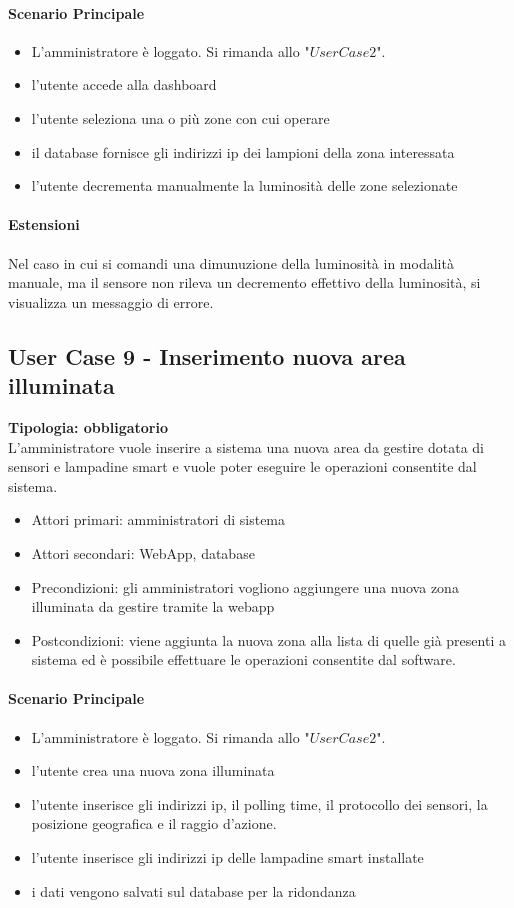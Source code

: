 \documentclass[12pt]{article}
\begin{document}
\paragraph{Scenario Principale}
\begin{itemize}
	\item L'amministratore è loggato. Si rimanda allo "$User Case 2$".
	\item l'utente accede alla dashboard
	\item l'utente seleziona una o più zone con cui operare
 	\item il database fornisce gli indirizzi ip dei lampioni della zona interessata
	\item l'utente decrementa manualmente la luminosità delle zone selezionate
\end{itemize}
\paragraph{Estensioni} Nel caso in cui si comandi una dimunuzione della luminosità in modalità manuale, ma il sensore non rileva un decremento effettivo della luminosità, si visualizza un messaggio di errore.
\subsection{User Case 9 - Inserimento nuova area illuminata}
\textbf{Tipologia: obbligatorio} \\
L'amministratore vuole inserire a sistema una nuova area da gestire dotata di sensori e lampadine smart e vuole poter eseguire le operazioni consentite dal sistema.
\begin{itemize}
	\item Attori primari: amministratori di sistema
	\item Attori secondari: WebApp, database
	\item Precondizioni: gli amministratori vogliono aggiungere una nuova zona illuminata da gestire tramite la webapp
	\item Postcondizioni: viene aggiunta la nuova zona alla lista di quelle già presenti a sistema ed è possibile effettuare le operazioni consentite dal software.
\end{itemize}
\paragraph{Scenario Principale}
\begin{itemize}
	\item L'amministratore è loggato. Si rimanda allo "$User Case 2$".
	\item l'utente crea una nuova zona illuminata
	\item l'utente inserisce gli indirizzi ip, il polling time, il protocollo dei sensori, la posizione geografica e il raggio d'azione.
	\item l'utente inserisce gli indirizzi ip delle lampadine smart installate
	\item i dati vengono salvati sul database per la ridondanza
\end{itemize}
\end{document}
